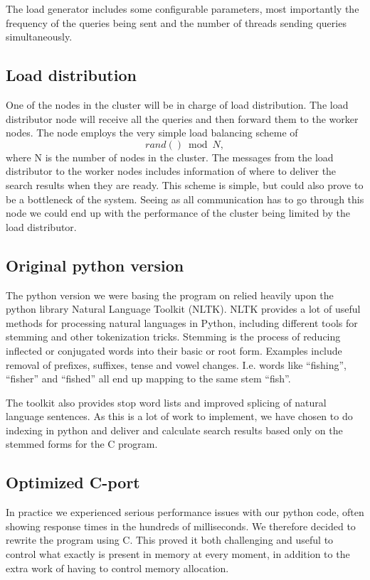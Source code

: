 The load generator includes some configurable parameters, most importantly the frequency of the queries being sent and the number of threads sending queries simultaneously.

\subsection{Load distribution}
One of the nodes in the cluster will be in charge of load distribution. The load distributor node will receive all the queries and then forward them to the worker nodes.
The node employs the very simple load balancing scheme of $$rand() \bmod N,$$ where N is the number of nodes in the cluster.
The messages from the load distributor to the worker nodes includes information of where to deliver the search results when they are ready.
This scheme is simple, but could also prove to be a bottleneck of the system. Seeing as all communication has to go through this node we could end up with the performance of the cluster being limited by the load distributor.

\subsection{Original python version}
The python version we were basing the program on relied heavily upon the python library Natural Language Toolkit\cite{nltk} (NLTK).
NLTK provides a lot of useful methods for processing natural languages in Python, including different tools for stemming and other tokenization tricks.
Stemming is the process of reducing inflected or conjugated words into their basic or root form. Examples include removal of prefixes, suffixes, tense and vowel changes. I.e. words like ``fishing'', ``fisher'' and ``fished'' all end up mapping to the same stem ``fish''.

The toolkit also provides stop word lists and improved splicing of natural language sentences. As this is a lot of work to implement, we have chosen to do indexing in python and deliver and calculate search results based only on the stemmed forms for the C program.

\subsection{Optimized C-port}
In practice we experienced serious performance issues with our python code, often showing response times in the hundreds of milliseconds. We therefore decided to rewrite the program using C. This proved it both challenging and useful to control what exactly is present in memory at every moment, in addition to the extra work of having to control memory allocation.

